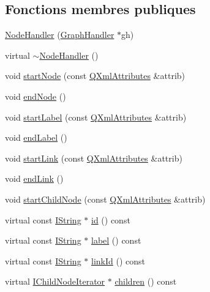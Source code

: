 \subsection*{Fonctions membres publiques}
\begin{DoxyCompactItemize}
\item 
\hyperlink{class_node_handler_a015c75555f24fdb6c766f03d9428395f}{Node\+Handler} (\hyperlink{class_graph_handler}{Graph\+Handler} $\ast$gh)
\item 
virtual \hyperlink{class_node_handler_a45c9285e2e70af9d2b59d00da93b9d97}{$\sim$\+Node\+Handler} ()
\item 
void \hyperlink{class_node_handler_a5f8dacefb2af9007ee3d52152cffb5f2}{start\+Node} (const \hyperlink{class_q_xml_attributes}{Q\+Xml\+Attributes} \&attrib)
\item 
void \hyperlink{class_node_handler_a78e510777877af3febaa3dad5b3db60d}{end\+Node} ()
\item 
void \hyperlink{class_node_handler_a3da4f2059dd96056ceebff579e165b6f}{start\+Label} (const \hyperlink{class_q_xml_attributes}{Q\+Xml\+Attributes} \&attrib)
\item 
void \hyperlink{class_node_handler_a3bfcccc6a52585bec1c96d2c7e6d7568}{end\+Label} ()
\item 
void \hyperlink{class_node_handler_a38ec6e9b5acafcf54334e1707d88b1c4}{start\+Link} (const \hyperlink{class_q_xml_attributes}{Q\+Xml\+Attributes} \&attrib)
\item 
void \hyperlink{class_node_handler_a8fd52ad97d34cedee8425f0a2e000e3d}{end\+Link} ()
\item 
void \hyperlink{class_node_handler_a90f5dc2ed13c6041f9a833df9a0b1c38}{start\+Child\+Node} (const \hyperlink{class_q_xml_attributes}{Q\+Xml\+Attributes} \&attrib)
\item 
virtual const \hyperlink{class_i_string}{I\+String} $\ast$ \hyperlink{class_node_handler_a9b0dafafe216d1c51cbe32136719d886}{id} () const 
\item 
virtual const \hyperlink{class_i_string}{I\+String} $\ast$ \hyperlink{class_node_handler_a0272e4bd7ff425dcdedecf4394fd1716}{label} () const 
\item 
virtual const \hyperlink{class_i_string}{I\+String} $\ast$ \hyperlink{class_node_handler_afdd753d4f110352b435ea1e45df002a4}{link\+Id} () const 
\item 
virtual \hyperlink{class_i_child_node_iterator}{I\+Child\+Node\+Iterator} $\ast$ \hyperlink{class_node_handler_aba2137417a68e02a80d91e7d85932f28}{children} () const 
\end{DoxyCompactItemize}
